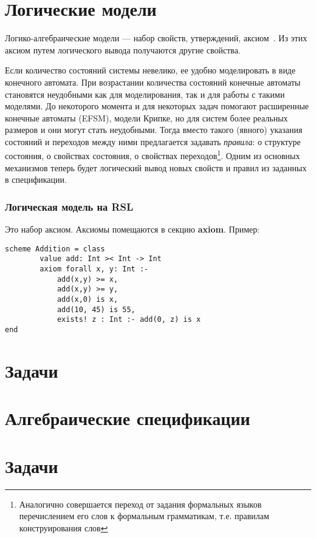 \documentclass[14pt, twoside]{extreport}
\newcommand{\head}[1]{\vspace{1cm}\subsubsection*{#1}}
\begin{document}
\section{Логические модели}

Логико-алгебраические модели --- набор свойств, утверждений, аксиом~\cite{kuliamin}. Из этих аксиом путем логического вывода получаются другие свойства.

Если количество состояний системы невелико, ее удобно моделировать в виде конечного автомата. При возрастании количества состояний конечные автоматы становятся неудобными как для моделирования, так и для работы с такими моделями. До некоторого момента и для некоторых задач помогают расширенные конечные автоматы (EFSM), модели Крипке, но для систем более реальных размеров и они могут стать неудобными. Тогда вместо такого (явного) указания состояний и переходов между ними предлагается задавать \emph{правила}: о структуре состояния, о свойствах состояния, о свойствах переходов\footnote{Аналогично совершается переход от задания формальных языков перечислением его слов к формальным грамматикам, т.е. правилам конструирования слов}. Одним из основных механизмов теперь будет логический вывод новых свойств и правил из заданных в спецификации.

\head{Логическая модель на RSL}
Это набор аксиом. Аксиомы помещаются в секцию \textbf{axiom}. Пример:
\begin{lstlisting}
scheme Addition = class
        value add: Int >< Int -> Int
        axiom forall x, y: Int :-
            add(x,y) >= x,
            add(x,y) >= y,
            add(x,0) is x,
            add(10, 45) is 55,
            exists! z : Int :- add(0, z) is x
end
\end{lstlisting}

\section*{Задачи}



\section{Алгебраические спецификации}



\section*{Задачи}
\end{document}
